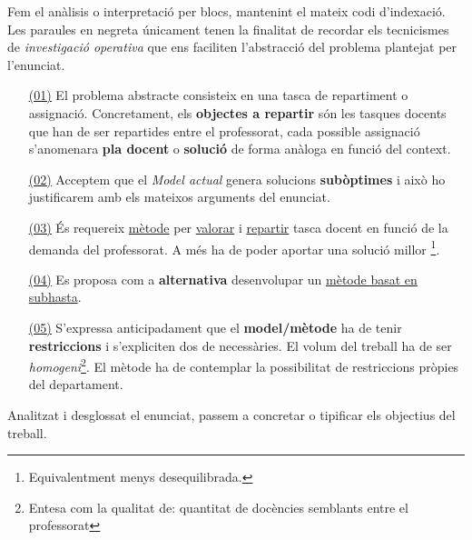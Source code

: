 \documentclass[10pt,twocolumn]{article}
\begin{document}
Fem el anàlisis o interpretació per blocs, mantenint el mateix codi d'indexació. Les paraules en negreta únicament tenen la finalitat de recordar els tecnicismes de \textit{investigació operativa} que ens faciliten l'abstracció del problema plantejat per l'enunciat.
\begin{itemize}
\item[{ \color{cyan!60} \underline{\underline{\normalcolor (01)}}}] El problema abstracte consisteix en una tasca de repartiment o assignació. Concretament, els \textbf{objectes a repartir} són les tasques docents que han de ser repartides entre  el professorat, cada possible assignació s'anomenara \textbf{pla docent} o \textbf{solució} de forma anàloga en funció del context.\\
\item[{ \color{blue!60} \underline{\underline{\normalcolor (02)}}}] Acceptem que el \textit{Model actual} genera solucions \textbf{subòptimes} i això ho  justificarem amb els mateixos arguments del enunciat.\\
\item[{ \color{green!60} \underline{\underline{\normalcolor (03)}}}] És requereix { \color{green!60} \underline{\normalcolor mètode}} per { \color{green!60} \underline{\normalcolor valorar}} i { \color{green!60} \underline{\normalcolor repartir}} tasca docent en funció de la demanda del professorat. A més ha de poder aportar una solució millor \footnote{Equivalentment menys desequilibrada.}. 
\item[{ \color{purple!60} \underline{\underline{\normalcolor (04)}}}] Es proposa com a \textbf{alternativa}  desenvolupar un  { \color{purple!60} \underline{\normalcolor mètode basat en subhasta}}.
\item[{ \color{violet!60} \underline{\underline{\normalcolor (05)}}}] S'expressa anticipadament que el \textbf{model/mètode} ha de tenir \textbf{restriccions}  i s'expliciten dos de necessàries. El volum del treball ha de ser \textit{homogeni}\footnote{Entesa com la qualitat de: quantitat de docències semblants entre el professorat}. El mètode ha de contemplar la possibilitat de restriccions pròpies del departament. 
\end{itemize}
Analitzat i desglossat el enunciat, passem a concretar o tipificar els objectius del treball.
\end{document}
